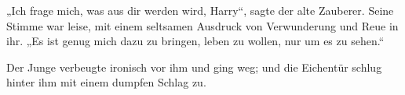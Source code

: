 „Ich frage mich, was aus dir werden wird, Harry“, sagte der alte Zauberer. Seine Stimme war leise, mit einem seltsamen Ausdruck von Verwunderung und Reue in ihr. „Es ist genug mich dazu zu bringen, leben zu wollen, nur um es zu sehen.“

Der Junge verbeugte ironisch vor ihm und ging weg; und die Eichentür schlug hinter ihm mit einem dumpfen Schlag zu.

